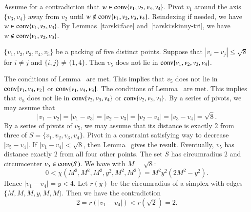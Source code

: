\begin{tarskidata}
\begin{tarski}
\begin{proved}
Assume for a contradiction that $w\in{\operatorname{conv}}\{v_1,v_2,v_3,v_4\}$.
Pivot $v_1$ around the axis $\{v_3,v_4\}$ away from $v_2$ until $w\not\in{\operatorname{conv}}\{v_1,v_2,v_3,v_4\}$.
Reindexing if needed, we have $w\in{\operatorname{conv}}\{v_1,v_2,v_3\}$.
By Lemmas~\ref{tarski:face} and~\ref{tarski:skinny-tri}, we have $w\not\in{\operatorname{conv}}\{v_1,v_2,v_3\}$.
%
\swallowed\end{proved}
\end{tarski}

\begin{tarski}

\begin{lemma}
$\{v_1,v_2,v_3,v_4,v_5\}$ be a packing of
five distinct points.  Suppose that $|v_i-v_j|\le
\sqrt8$ for $i\ne j$ and $\{i,j\}\ne\{1,4\}$. Then $v_5$ does not lie
in ${\operatorname{conv}}\{v_1,v_2,v_3,v_4\}$.
\end{lemma}


\begin{proved}
The conditions of Lemma~ are met. This implies
that $v_5$ does not lie in ${\operatorname{conv}}\{v_1,v_4,v_2\}$ or
	${\operatorname{conv}}\{v_1,v_4,v_3\}$.
The conditions of Lemma~ are met.  This implies that
$v_5$ does not lie in ${\operatorname{conv}}\{v_2,v_3,v_4\}$ or
	${\operatorname{conv}}\{v_2,v_3,v_1\}$.
By a series of pivots, we may assume that
	$$|v_1-v_2|=|v_1-v_3|=|v_2-v_3|=|v_2-v_4|=|v_3-v_4|=\sqrt8.$$
By a series of pivots of $v_5$, we may assume that its distance is exactly
$2$ from three of $S=\{v_1,v_2,v_3,v_4\}$.  
Pivot in a constraint satisfying way to decrease $|v_5-v_4|$.
If $|v_1-v_4|<\sqrt8$, then Lemma~ %
gives the
result.
Eventually, $v_5$ has distance exactly $2$ from all four other points.
The set $S$ has circumradius $2$ and circumcenter $v_5\in{\operatorname{conv}}(S)$.  
	We have with $M=\sqrt8$:
	$$0 < \chi(M^2,M^2,M^2,y^2,M^2,M^2)= M^2 y^2 (2M^2 - y^2).$$
Hence $|v_1-v_4|=y < 4$.
Let $r(y)$ be the circumradius of a simplex with edges $\{M,M,M,y,M,M)$.
Then we have the contradiction
	$$2 = r(|v_1-v_4|) < r(\sqrt2) = 2.$$
\swallowed\end{proved}
\end{tarski}






\end{tarskidata}
